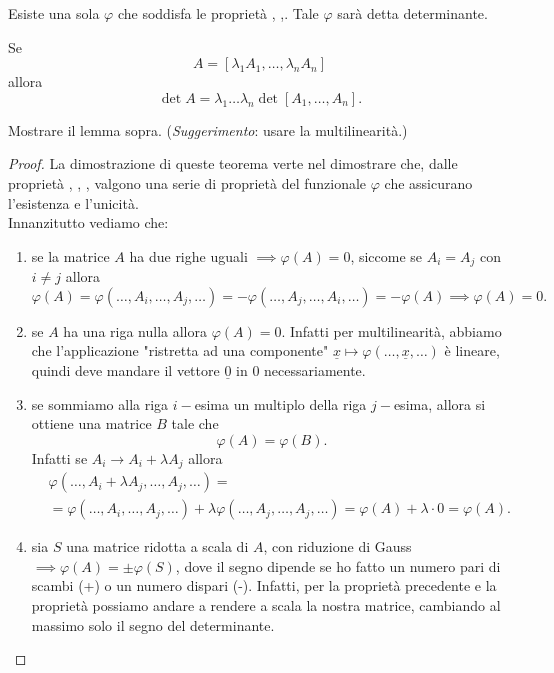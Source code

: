 \begin{theorem} \label{thm:ex_uniq_det}
    Esiste una sola $\varphi$ che soddisfa le proprietà , ,. Tale $\varphi$ sarà detta determinante.
\end{theorem}
\begin{lemma}
    Se
    $$
    A = [\lambda_1 A_1, \ldots, \lambda_n A_n]
    $$ allora
    $$
        \det{A} = \lambda_1 \ldots \lambda_n \det{[A_1, \ldots, A_n]}.
    $$
\end{lemma}
\begin{exercise}
    Mostrare il lemma sopra. (\emph{Suggerimento}: usare la multilinearità.)
\end{exercise}
\begin{proof}
    La dimostrazione di queste teorema verte nel dimostrare che, dalle proprietà , , , valgono una serie di proprietà del funzionale $\varphi$ che assicurano l'esistenza e l'unicità. \\
    Innanzitutto vediamo che:
    \begin{enumerate}
        \item se la matrice $A$ ha due righe uguali $\implies \varphi(A) = 0$, siccome se $A_i = A_j$ con $i \neq j$ allora
        $$
            \varphi(A) = \varphi(\ldots, A_i, \ldots, A_j, \ldots) = - \varphi(\ldots, A_j, \ldots, A_i, \ldots) = - \varphi(A) \implies \varphi(A) = 0.
        $$
        \item se $A$ ha una riga nulla allora $\varphi(A) = 0$. Infatti per multilinearità, abbiamo che l'applicazione "ristretta ad una componente" $\underline{x} \mapsto \varphi(\ldots, \underline{x}, \ldots)$ è lineare, quindi deve mandare il vettore $\underline{0}$ in $0$ necessariamente.
        \item se sommiamo alla riga $i-$esima un multiplo della riga $j-$esima, allora si ottiene una matrice $B$ tale che
        $$
            \varphi(A) = \varphi(B).
        $$
        Infatti se $A_i \to A_i + \lambda A_j$ allora
        \begin{align}
            &\varphi(\ldots, A_i + \lambda A_j, \ldots, A_j, \ldots) = \\
            &= \varphi(\ldots, A_i, \ldots, A_j, \ldots) + \lambda \varphi(\ldots, A_j, \ldots, A_j, \ldots) = \varphi(A) + \lambda \cdot 0 = \varphi(A).
        \end{align}
        \item sia $S$ una matrice ridotta a scala di $A$, con riduzione di Gauss $\implies \varphi(A) = \pm \varphi(S)$, dove il segno dipende se ho fatto un numero pari di scambi (+) o un numero dispari (-). Infatti, per la proprietà precedente e la proprietà  possiamo andare a rendere a scala la nostra matrice, cambiando al massimo solo il segno del determinante.

\end{enumerate}
\end{proof}
